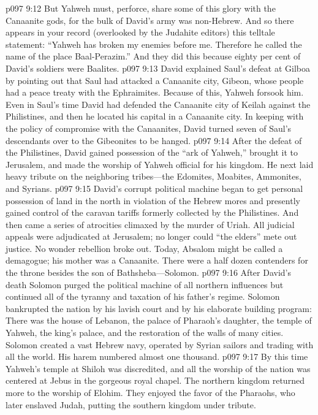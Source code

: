 \vs p097 9:12 But Yahweh must, perforce, share some of this glory with the Canaanite gods, for the bulk of David’s army was non\hyp{}Hebrew. And so there appears in your record (overlooked by the Judahite editors) this telltale statement: “Yahweh has broken my enemies before me. Therefore he called the name of the place Baal\hyp{}Perazim.” And they did this because eighty per cent of David’s soldiers were Baalites.
\vs p097 9:13 David explained Saul’s defeat at Gilboa by pointing out that Saul had attacked a Canaanite city, Gibeon, whose people had a peace treaty with the Ephraimites. Because of this, Yahweh forsook him. Even in Saul’s time David had defended the Canaanite city of Keilah against the Philistines, and then he located his capital in a Canaanite city. In keeping with the policy of compromise with the Canaanites, David turned seven of Saul’s descendants over to the Gibeonites to be hanged.
\vs p097 9:14 After the defeat of the Philistines, David gained possession of the “ark of Yahweh,” brought it to Jerusalem, and made the worship of Yahweh official for his kingdom. He next laid heavy tribute on the neighboring tribes---the Edomites, Moabites, Ammonites, and Syrians.
\vs p097 9:15 David’s corrupt political machine began to get personal possession of land in the north in violation of the Hebrew mores and presently gained control of the caravan tariffs formerly collected by the Philistines. And then came a series of atrocities climaxed by the murder of Uriah. All judicial appeals were adjudicated at Jerusalem; no longer could “the elders” mete out justice. No wonder rebellion broke out. Today, Absalom might be called a demagogue; his mother was a Canaanite. There were a half dozen contenders for the throne besides the son of Bathsheba---Solomon.
\pc \vs p097 9:16 After David’s death Solomon purged the political machine of all northern influences but continued all of the tyranny and taxation of his father’s regime. Solomon bankrupted the nation by his lavish court and by his elaborate building program: There was the house of Lebanon, the palace of Pharaoh’s daughter, the temple of Yahweh, the king’s palace, and the restoration of the walls of many cities. Solomon created a vast Hebrew navy, operated by Syrian sailors and trading with all the world. His harem numbered almost one thousand.
\pc \vs p097 9:17 By this time Yahweh’s temple at Shiloh was discredited, and all the worship of the nation was centered at Jebus in the gorgeous royal chapel. The northern kingdom returned more to the worship of Elohim. They enjoyed the favor of the Pharaohs, who later enslaved Judah, putting the southern kingdom under tribute.
